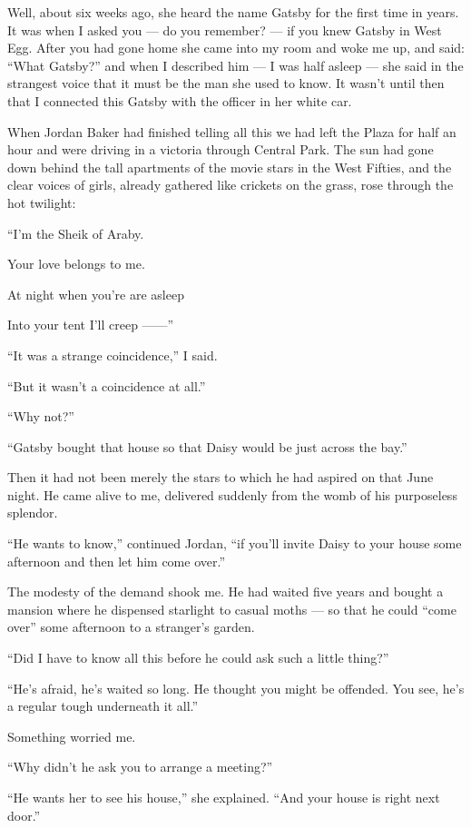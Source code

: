 \documentclass{znotebook}
\begin{document}
Well, about six weeks ago, she heard the name Gatsby for the first time in years. It was when I asked you — do you remember? — if you knew Gatsby in West Egg. After you had gone home she came into my room and woke me up, and said: ``What Gatsby?'' and when I described him — I was half asleep — she said in the strangest voice that it must be the man she used to know. It wasn't until then that I connected this Gatsby with the officer in her white car.

When Jordan Baker had finished telling all this we had left the Plaza for half an hour and were driving in a victoria through Central Park. The sun had gone down behind the tall apartments of the movie stars in the West Fifties, and the clear voices of girls, already gathered like crickets on the grass, rose through the hot twilight:

``I'm the Sheik of Araby.

Your love belongs to me.

At night when you're are asleep

Into your tent I'll creep ——''

``It was a strange coincidence,'' I said.

``But it wasn't a coincidence at all.''

``Why not?''

``Gatsby bought that house so that Daisy would be just across the bay.''

Then it had not been merely the stars to which he had aspired on that June night. He came alive to me, delivered suddenly from the womb of his purposeless splendor.

``He wants to know,'' continued Jordan, ``if you'll invite Daisy to your house some afternoon and then let him come over.''

The modesty of the demand shook me. He had waited five years and bought a mansion where he dispensed starlight to casual moths — so that he could ``come over'' some afternoon to a stranger's garden.

``Did I have to know all this before he could ask such a little thing?''

``He's afraid, he's waited so long. He thought you might be offended. You see, he's a regular tough underneath it all.''

Something worried me.

``Why didn't he ask you to arrange a meeting?''

``He wants her to see his house,'' she explained. ``And your house is right next door.''
\end{document}
